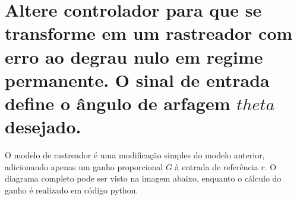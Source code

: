 \documentclass[13pt]{article}
\begin{document}
\hypertarget{altere-controlador-para-que-se-transforme-em-um-rastreador-com-erro-ao-degrau-nulo-em-regime-permanente.-o-sinal-de-entrada-define-o-uxe2ngulo-de-arfagem-ux1d703-desejado.}{%
    \section{Altere controlador para que se transforme em um rastreador com
      erro ao degrau nulo em regime permanente. O sinal de entrada define o
      ângulo de arfagem \(theta\)
      desejado.}}

O modelo de rastreador é uma modificação simples do modelo anterior,
adicionando apenas um ganho proporcional \(G\) à entrada de referência
\(r\). O diagrama completo pode ser visto na imagem abaixo, enquanto o
cálculo do ganho é realizado em código python.

\begin{figure}[H]
    \centering


    
\end{figure}
\end{document}
